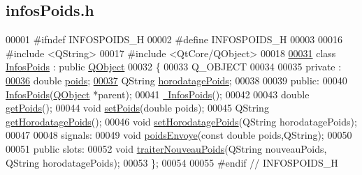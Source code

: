 \hypertarget{infos_poids_8h_source}{}\subsection{infos\+Poids.\+h}
\label{infos_poids_8h_source}

\begin{DoxyCode}
00001 \textcolor{preprocessor}{#ifndef INFOSPOIDS\_H}
00002 \textcolor{preprocessor}{#define INFOSPOIDS\_H}
00003 
00016 \textcolor{preprocessor}{#include <QString>}
00017 \textcolor{preprocessor}{#include <QtCore/QObject>}
00018 
\hyperlink{class_infos_poids}{00031} \textcolor{keyword}{class }\hyperlink{class_infos_poids}{InfosPoids} : \textcolor{keyword}{public} \hyperlink{class_q_object}{QObject}
00032 \{
00033     Q\_OBJECT
00034 
00035 private :
\hyperlink{class_infos_poids_ac5faebb99bd0f87f96b442f10349cbd8}{00036}     \textcolor{keywordtype}{double} \hyperlink{class_infos_poids_ac5faebb99bd0f87f96b442f10349cbd8}{poids};
\hyperlink{class_infos_poids_a6cff463552adfdde9430073a87878494}{00037}     QString \hyperlink{class_infos_poids_a6cff463552adfdde9430073a87878494}{horodatagePoids};
00038 
00039 \textcolor{keyword}{public}:
00040      \hyperlink{class_infos_poids_a25a9086e75ce6c7e8391c3908c9324c0}{InfosPoids}(\hyperlink{class_q_object}{QObject} *parent);
00041      \hyperlink{class_infos_poids_a14038b5639c79ff6558c91aec12013d1}{~InfosPoids}();
00042 
00043      \textcolor{keywordtype}{double} \hyperlink{class_infos_poids_a902fb0222d3b2fa396987daed57377d2}{getPoids}();
00044      \textcolor{keywordtype}{void} \hyperlink{class_infos_poids_a23bb9c5939d0ee5cab0ecf821cdc6779}{setPoids}(\textcolor{keywordtype}{double} poids);
00045      QString \hyperlink{class_infos_poids_a9bd9ffa1a5fcd75a8d75bd7330727620}{getHorodatagePoids}();
00046      \textcolor{keywordtype}{void} \hyperlink{class_infos_poids_add0957f341ade104a4521ead7562dff8}{setHorodatagePoids}(QString horodatagePoids);
00047 
00048 signals:
00049     \textcolor{keywordtype}{void} \hyperlink{class_infos_poids_a3c4ca9068911e45d0207de051ef5b402}{poidsEnvoye}(\textcolor{keyword}{const} \textcolor{keywordtype}{double} poids,QString);
00050 
00051 \textcolor{keyword}{public} slots:
00052     \textcolor{keywordtype}{void} \hyperlink{class_infos_poids_aa5284d38d33adba31ba033b8af61cc96}{traiterNouveauPoids}(QString nouveauPoids, QString horodatagePoids);
00053 \};
00054 
00055 \textcolor{preprocessor}{#endif // INFOSPOIDS\_H}
\end{DoxyCode}
